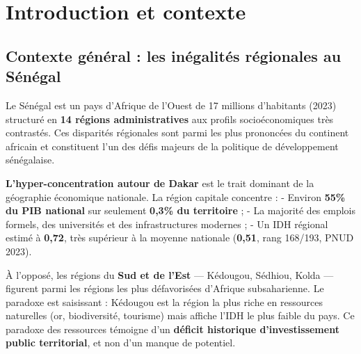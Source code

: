 \documentclass[
]{article}
\begin{document}
\newpage
\listoffigures
{}

\newpage
\listoftables
{}

\newpage
{}

\section{Introduction et contexte}\label{introduction-et-contexte}

\subsection{Contexte général : les inégalités régionales au
Sénégal}\label{contexte-guxe9nuxe9ral-les-inuxe9galituxe9s-ruxe9gionales-au-suxe9nuxe9gal}

Le Sénégal est un pays d'Afrique de l'Ouest de 17 millions d'habitants
(2023) structuré en \textbf{14 régions administratives} aux profils
socioéconomiques très contrastés. Ces disparités régionales sont parmi
les plus prononcées du continent africain et constituent l'un des défis
majeurs de la politique de développement sénégalaise.

\textbf{L'hyper-concentration autour de Dakar} est le trait dominant de
la géographie économique nationale. La région capitale concentre : -
Environ \textbf{55\% du PIB national} sur seulement \textbf{0,3\% du
territoire} ; - La majorité des emplois formels, des universités et des
infrastructures modernes ; - Un IDH régional estimé à \textbf{0,72},
très supérieur à la moyenne nationale (\textbf{0,51}, rang 168/193, PNUD
2023).

À l'opposé, les régions du \textbf{Sud et de l'Est} --- Kédougou,
Sédhiou, Kolda --- figurent parmi les régions les plus défavorisées
d'Afrique subsaharienne. Le paradoxe est saisissant : Kédougou est la
région la plus riche en ressources naturelles (or, biodiversité,
tourisme) mais affiche l'IDH le plus faible du pays. Ce paradoxe des
ressources témoigne d'un \textbf{déficit historique d'investissement
public territorial}, et non d'un manque de potentiel.

\begingroup\fontsize{10}{12}\selectfont
\end{document}
